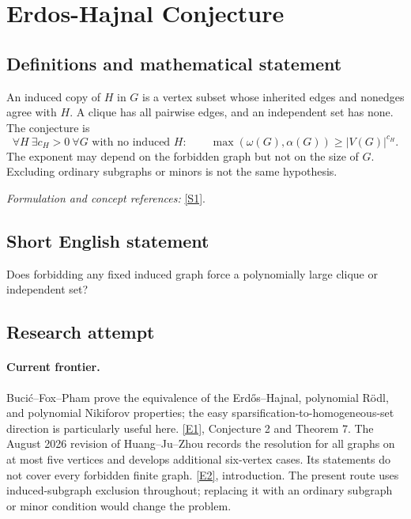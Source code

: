 \documentclass[11pt,a4paper]{article}
\newcommand{\sref}[2]{\hyperlink{source:#1:#2}{[S#2]}}
\newcommand{\eref}[2]{\hyperlink{extra:#1:#2}{[E#2]}}
\newif\ifshowcatalogue
\newcommand{\cataloguescope}[1]{\ifshowcatalogue
 \paragraph{Exact scope in the supplied catalogue.}
 \begin{quote}\small #1\end{quote}\fi}
\numberwithin{equation}{section}
\begin{document}
\setcounter{section}{125}
\clearpage
\section{\texorpdfstring{Erdos-Hajnal Conjecture}{Erdos-Hajnal Conjecture}}\label{126}
\subsection{Definitions and mathematical statement}
An induced copy of $H$ in $G$ is a vertex subset whose inherited edges and nonedges agree with $H$. A clique has all pairwise edges, and an independent set has none. The conjecture is
\[
 \forall H\ \exists c_H>0\ \forall G\text{ with no induced }H:\qquad
 \max(\omega(G),\alpha(G))\ge |V(G)|^{c_H}.
\]
The exponent may depend on the forbidden graph but not on the size of $G$. Excluding ordinary subgraphs or minors is not the same hypothesis.
\par\smallskip\textit{Formulation and concept references:} \sref{126}{1}.
\cataloguescope{Prove that for every fixed finite graph H there is a constant c\_H>0 such that every n-vertex graph with no induced subgraph isomorphic to H contains a clique or an independent set of size at least n\textasciicircum{}\{c\_H\}.}
\subsection{Short English statement}
Does forbidding any fixed induced graph force a polynomially large clique or independent set?
\subsection{Research attempt}

\paragraph{Current frontier.}
Buci\'c--Fox--Pham prove the equivalence of the Erd\H{o}s--Hajnal,
polynomial R\"odl, and polynomial Nikiforov properties; the easy
sparsification-to-homogeneous-set direction is particularly useful here.
\eref{126}{1}, Conjecture 2 and Theorem 7.
The August 2026 revision of Huang--Ju--Zhou records the resolution for
all graphs on at most five vertices and develops additional six-vertex
cases.  Its statements do not cover every forbidden finite graph.
\eref{126}{2}, introduction.
The present route uses induced-subgraph exclusion throughout; replacing
it with an ordinary subgraph or minor condition would change the problem.
\end{document}
